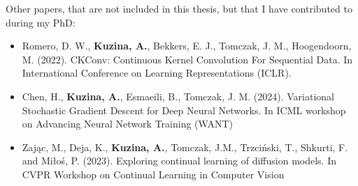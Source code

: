 Other papers, that are not included in this thesis, but that I have contributed to during my PhD:
\begin{itemize}
    \item Romero, D. W., \textbf{Kuzina, A.}, Bekkers, E. J., Tomczak, J. M., Hoogendoorn, M. (2022). CKConv: Continuous Kernel Convolution For Sequential Data. In International Conference on Learning Representations (ICLR).
    \item Chen, H.\footnotemark[1], \textbf{Kuzina, A.}\footnotemark[1], Esmaeili, B., Tomczak, J. M. (2024). Variational Stochastic Gradient Descent for Deep Neural Networks. In ICML workshop on Advancing Neural Network Training (WANT)
    \item Zając, M., Deja, K., \textbf{Kuzina, A.}, Tomczak, J.M., Trzciński, T., Shkurti, F. and Miłoś, P. (2023). Exploring continual learning of diffusion models. In CVPR Workshop on Continual Learning in Computer Vision
\end{itemize}